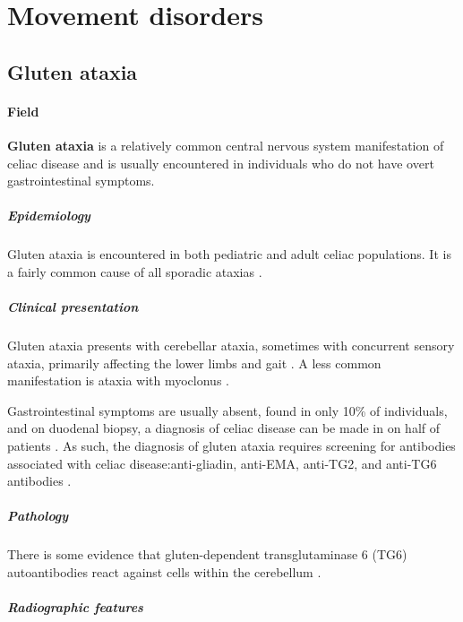 \chapter{Movement disorders}

\section{Gluten ataxia}

\subsubsection{Field}

\textbf{Gluten ataxia} is a relatively common central nervous system manifestation of celiac disease and is usually encountered in individuals who do not have overt gastrointestinal symptoms.

\paragraph{Epidemiology}

Gluten ataxia is encountered in both pediatric and adult celiac populations. It is a fairly common cause of all sporadic ataxias .

\paragraph{Clinical presentation}

Gluten ataxia presents with cerebellar ataxia, sometimes with concurrent sensory ataxia, primarily affecting the lower limbs and gait . A less common manifestation is ataxia with myoclonus .

Gastrointestinal symptoms are usually absent, found in only 10\% of individuals, and on duodenal biopsy, a diagnosis of celiac disease can be made in on half of patients . As such, the diagnosis of gluten ataxia requires screening for antibodies associated with celiac disease:anti-gliadin, anti-EMA, anti-TG2, and anti-TG6 antibodies .

\paragraph{Pathology}

There is some evidence that gluten-dependent transglutaminase 6 (TG6) autoantibodies react against cells within the cerebellum .

\paragraph{Radiographic features}

